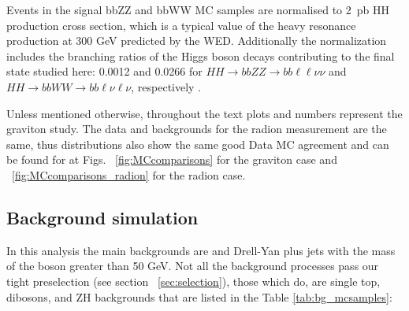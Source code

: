 Events in the signal bbZZ and bbWW MC samples are normalised to 2~pb HH production cross section, which is a typical value of the heavy resonance production at 300 GeV predicted by the WED. Additionally the normalization includes the branching ratios of the Higgs boson decays contributing to the final state studied here: 0.0012 and 0.0266 for $HH\to bbZZ\to bb\ell\ell\nu\nu$ and $HH\to bbWW\to bb\ell\nu\ell\nu$, respectively \cite{CERNYR4}.


Unless mentioned otherwise, throughout the text plots and numbers represent the graviton study. The data and backgrounds for the radion measurement are the same, thus distributions also show the same good Data MC agreement and can be found for at Figs. ~\ref{fig:MCcomparisons} for the graviton case and ~\ref{fig:MCcomparisons_radion} for the radion case.

\subsection{Background simulation\label{sec:bkgMC}}

In this analysis the main backgrounds are \ttbar and Drell-Yan plus
jets with the mass of the boson greater than 50 GeV. Not all the
background processes pass our tight preselection (see section ~\ref{sec:selection}),
those which do, are single top, dibosons, and ZH backgrounds that are
listed in the Table \ref{tab:bg_mcsamples}:

